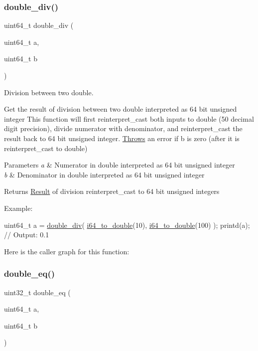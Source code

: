 \subsubsection{\texorpdfstring{double\+\_\+div()}{double\_div()}}
{\footnotesize\ttfamily uint64\+\_\+t double\+\_\+div (\begin{DoxyParamCaption}\item[{uint64\+\_\+t}]{a,  }\item[{uint64\+\_\+t}]{b }\end{DoxyParamCaption})}



Division between two double. 

Get the result of division between two double interpreted as 64 bit unsigned integer This function will first reinterpret\+\_\+cast both inputs to double (50 decimal digit precision), divide numerator with denominator, and reinterpret\+\_\+cast the result back to 64 bit unsigned integer. \mbox{\hyperlink{struct_throws}{Throws}} an error if b is zero (after it is reinterpret\+\_\+cast to double) 
\begin{DoxyParams}{Parameters}
{\em a} & Numerator in double interpreted as 64 bit unsigned integer \\
\hline
{\em b} & Denominator in double interpreted as 64 bit unsigned integer \\
\hline
\end{DoxyParams}
\begin{DoxyReturn}{Returns}
\mbox{\hyperlink{struct_result}{Result}} of division reinterpret\+\_\+cast to 64 bit unsigned integers
\end{DoxyReturn}
Example\+: 
\begin{DoxyCode}
uint64\_t a = \mbox{\hyperlink{group__mathcapi_gad67af06a6b0e9dbbf3be05d6bf99257c}{double\_div}}( \mbox{\hyperlink{group__mathcapi_gaec506d4ee77526e67ab5f2a8ef54f2b5}{i64\_to\_double}}(10), \mbox{\hyperlink{group__mathcapi_gaec506d4ee77526e67ab5f2a8ef54f2b5}{i64\_to\_double}}(100) );
printd(a); \textcolor{comment}{// Output: 0.1}
\end{DoxyCode}
 Here is the caller graph for this function\+:
\mbox{\label{group__mathcapi_ga8911bd5a24e0d8287d6b3d5a81500e6a}} 
\subsubsection{\texorpdfstring{double\+\_\+eq()}{double\_eq()}}
{\footnotesize\ttfamily uint32\+\_\+t double\+\_\+eq (\begin{DoxyParamCaption}\item[{uint64\+\_\+t}]{a,  }\item[{uint64\+\_\+t}]{b }\end{DoxyParamCaption})}



